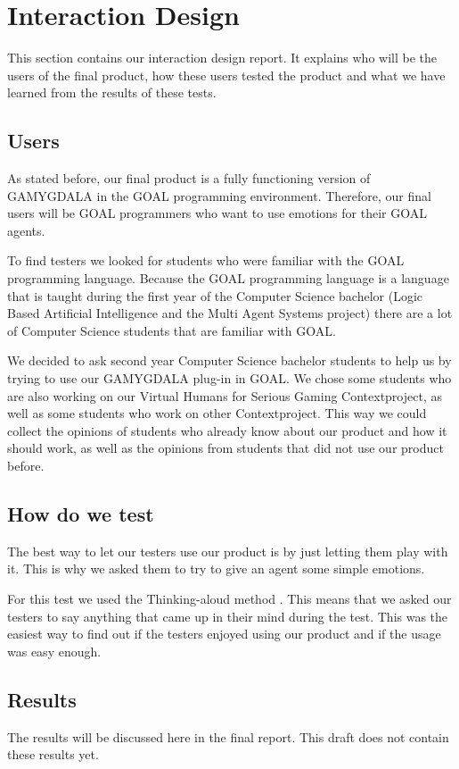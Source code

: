\section{Interaction Design}
This section contains our interaction design report. It explains who will be the users of the final product, how these users tested the product and what we have learned from the results of these tests.

\subsection{Users}
As stated before, our final product is a fully functioning version of GAMYGDALA in the GOAL programming environment. Therefore, our final users will be GOAL programmers who want to use emotions for their GOAL agents. \par
To find testers we looked for students who were familiar with the GOAL programming language. Because the GOAL programming language is a language that is taught during the first year of the Computer Science bachelor (Logic Based Artificial Intelligence and the Multi Agent Systems project) there are a lot of Computer Science students that are familiar with GOAL. \par
We decided to ask second year Computer Science bachelor students to help us by trying to use our GAMYGDALA plug-in in GOAL. We chose some students who are also working on our Virtual Humans for Serious Gaming Contextproject, as well as some students who work on other Contextproject. This way we could collect the opinions of students who already know about our product and how it should work, as well as the opinions from students that did not use our product before.

\subsection{How do we test}
The best way to let our testers use our product is by just letting them play with it. This is why we asked them to try to give an agent some simple emotions. \par
For this test we used the Thinking-aloud method \citep{thinking-aloud}. This means that we asked our testers to say anything that came up in their mind during the test. This was the easiest way to find out if the testers enjoyed using our product and if the usage was easy enough.

\subsection{Results}
The results will be discussed here in the final report. This draft does not contain these results yet.